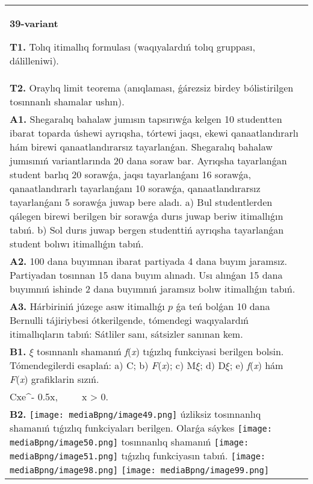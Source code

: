 \documentclass{article}
\begin{document}
\begin{tabular}{m{17cm}}
\textbf{39-variant}
\newline

\textbf{T1.} Tolıq itimallıq formulası (waqıyalardıń tolıq gruppası, dálilleniwi).
 \\
\textbf{T2.} Oraylıq limit teorema (anıqlaması, ǵárezsiz birdey bólistirilgen tosınnanlı shamalar ushın).
 \\
\textbf{A1.} Shegaralıq bahalaw jumısın tapsırıwǵa kelgen 10 studentten ibarat toparda úshewi ayrıqsha, tórtewi jaqsı, ekewi qanaatlandırarlı hám birewi qanaatlandırarsız tayarlanǵan. Shegaralıq bahalaw jumısınıń variantlarında 20 dana soraw bar. Ayrıqsha tayarlanǵan student barlıq 20 sorawǵa, jaqsı tayarlanǵanı 16 sorawǵa, qanaatlandırarlı tayarlanǵanı 10 sorawǵa, qanaatlandırarsız tayarlanǵanı 5 sorawǵa juwap bere aladı. a) Bul studentlerden qálegen birewi berilgen bir sorawǵa durıs juwap beriw itimallıǵın tabıń. b) Sol durıs juwap bergen studenttiń ayrıqsha tayarlanǵan student bolıwı itimallıǵın tabıń.
 \\
\textbf{A2.} 100 dana buyımnan ibarat partiyada 4 dana buyım jaramsız. Partiyadan tosınnan 15 dana buyım alınadı. Usı alınǵan 15 dana buyımnıń ishinde 2 dana buyımnıń jaramsız bolıw itimallıǵın tabıń.
 \\
\textbf{A3.} Hárbiriniń júzege asıw itimallıǵı $p$ ǵa teń bolǵan 10 dana Bernulli tájiriybesi ótkerilgende, tómendegi waqıyalardıń itimallıqların tabıń: Sátliler sanı, sátsizler sanınan kem.
 \\
\textbf{B1.} $\xi$ tosınnanlı shamanıń \emph{f}(\emph{x}) tıǵızlıq funkciyasi berilgen bolsin. Tómendegilerdi esaplań: a) C; b) \emph{F}(\emph{x}); c) M$\xi$; d) D$\xi$; e) \emph{f}(\emph{x}) hám \emph{F}(\emph{x}) grafiklarin sızıń.\(f(x) = \left\{ \begin{matrix}
\ \ \ \ \ \ \ \ 0,\ \ \ \ \ \ x \leq 0, \\
Cxe^{- 0.5x},\ \ \ \ \ x > 0.\ \ 
\end{matrix} \right.\ \)
 \\
\textbf{B2.} \texttt{[image: mediaBpng/image49.png]} úzliksiz tosınnanlıq shamanıń tıǵızlıq funkciyaları berilgen. Olarǵa sáykes \texttt{[image: mediaBpng/image50.png]} tosınnanlıq shamanıń \texttt{[image: mediaBpng/image51.png]} tıǵızlıq funkciyasın tabıń. \texttt{[image: mediaBpng/image98.png]} \texttt{[image: mediaBpng/image99.png]} \\

\end{tabular}
\end{document}
